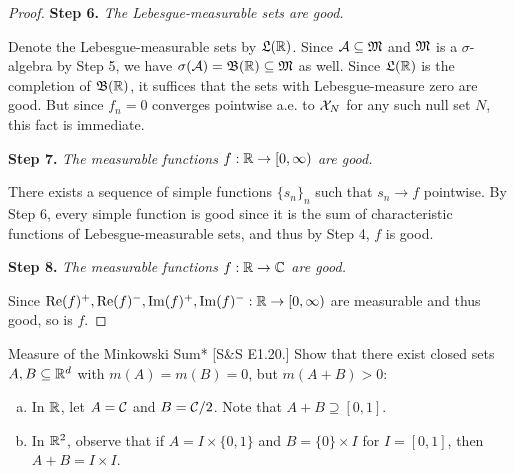 \begin{proof}
    \textbf{Step 6.} \textit{The Lebesgue-measurable sets are good.}

    Denote the Lebesgue-measurable sets by \(\mathfrak{L}(\mathbb{R})\). Since \(\mathcal{A} \subseteq \mathfrak{M}\) and \(\mathfrak{M}\) is a \(\sigma\)-algebra by Step 5, we have \(\sigma(\mathcal{A}) = \mathfrak{B}(\mathbb{R}) \subseteq \mathfrak{M}\) as well. Since \(\mathfrak{L}(\mathbb{R})\) is the completion of \(\mathfrak{B}(\mathbb{R})\), it suffices that the sets with Lebesgue-measure zero are good. But since \(f_n = 0\) converges pointwise a.e. to \(\mathcal{X}_N\) for any such null set \(N\), this fact is immediate. 

    \textbf{Step 7.} \textit{The measurable functions \(f : \mathbb{R} \to [0, \infty)\) are good.}

    There exists a sequence of simple functions \(\{s_n\}_n\) such that \(s_n \to f\) pointwise. By Step 6, every simple function is good since it is the sum of characteristic functions of Lebesgue-measurable sets, and thus by Step 4, \(f\) is good. 

    \textbf{Step 8.} \textit{The measurable functions \(f : \mathbb{R} \to \mathbb{C}\) are good.}

    Since \(\Re(f)^+, \Re(f)^-, \Im(f)^+, \Im(f)^- : \mathbb{R} \to [0, \infty)\) are measurable and thus good, so is \(f\). 
\end{proof}

\begin{problem}{Measure of the Minkowski Sum}*
    [S\&S E1.20.] Show that there exist closed sets \(A,B \subseteq \mathbb{R}^d\) with \(m(A) = m(B) = 0\), but \(m(A+B) > 0\):
    \begin{enumerate}[(a)]
        \itemsep0em
        \item In \(\mathbb{R}\), let \(A = \mathcal{C}\) and \(B = \mathcal{C}/2\). Note that \(A+B \supseteq [0, 1]\).
        \item In \(\mathbb{R}^2\), observe that if \(A = I \times \{0,1\}\) and \(B = \{0\} \times I\) for \(I = [0,1]\), then \(A+B = I \times I\). 
    \end{enumerate}
\end{problem}

